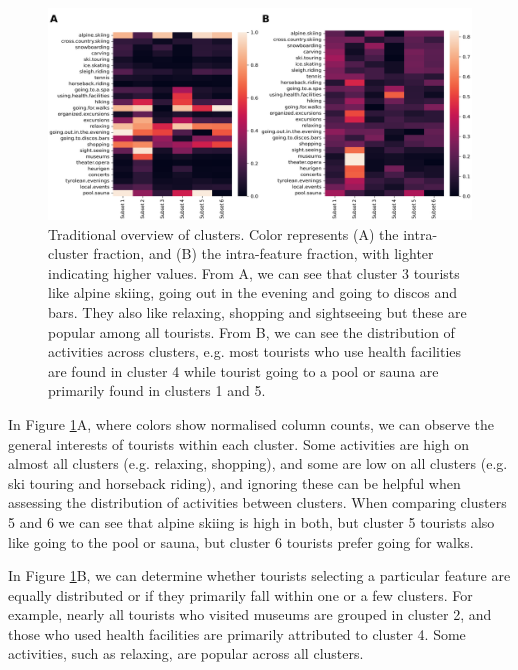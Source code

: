 \documentclass[article]{ajs}
\begin{document}
\begin{figure}[h!]
    \centering
    \includegraphics[width=1\textwidth]{winteractiv_heatmap.png}
    \caption{Traditional overview of clusters. Color represents (A) the intra-cluster fraction, and (B) the intra-feature fraction, with lighter indicating higher values. From A, we can see that cluster 3 tourists like alpine skiing, going out in the evening and going to discos and bars. They also like relaxing, shopping and sightseeing but these are popular among all tourists. From B, we can see the distribution of activities across clusters, e.g. most tourists who use health facilities are found in cluster 4 while tourist going to a pool or sauna are primarily found in clusters 1 and 5.}
    \label{fig:winteractiv_heatmap}
\end{figure}

In Figure \ref{fig:winteractiv_heatmap}A, where colors show normalised column counts, we can observe the general interests of tourists within each cluster. Some activities are high on almost all clusters (e.g. relaxing, shopping), and some are low on all clusters (e.g. ski touring and horseback riding), and ignoring these can be helpful when assessing the distribution of activities between clusters. When comparing clusters 5 and 6 we can see that alpine skiing is high in both, but cluster 5 tourists also like going to the pool or sauna, but cluster 6 tourists prefer going for walks.  %

In Figure \ref{fig:winteractiv_heatmap}B, we can determine whether tourists selecting a particular feature are equally distributed or if they primarily fall within one or a few clusters.  For example, nearly all tourists who visited museums are grouped in cluster 2, and those who used health facilities are primarily attributed to cluster 4. Some activities, such as relaxing, are popular across all clusters.
\end{document}
